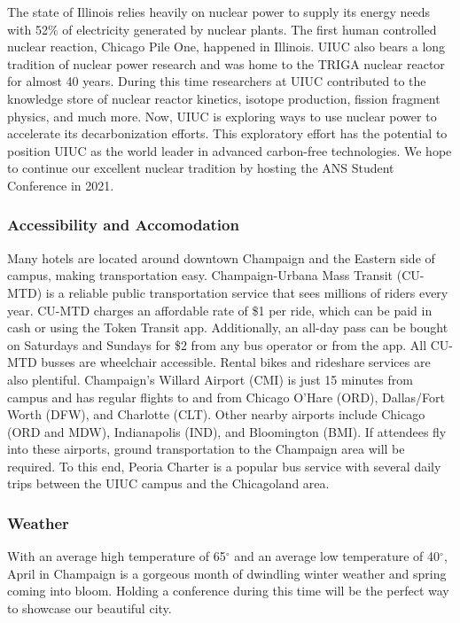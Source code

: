 The state of Illinois relies heavily on nuclear power to supply its energy needs with 52$\%$ of electricity generated by nuclear plants. The first human controlled nuclear reaction, Chicago Pile One, happened in Illinois. UIUC also bears a long tradition of nuclear power research and was home to the TRIGA nuclear reactor for almost 40 years. During this time researchers at UIUC contributed to the knowledge store of nuclear reactor kinetics, isotope production, fission fragment physics, and much more. Now, UIUC is exploring ways to use nuclear power to accelerate its decarbonization efforts. This exploratory effort has the potential to position UIUC as the world leader in advanced carbon-free technologies. We hope to continue our excellent nuclear tradition by hosting the ANS Student Conference in 2021. 
\clearpage

\subsubsection{Accessibility and Accomodation}
 Many hotels are located around downtown Champaign and the Eastern 
 side of campus, making transportation easy. Champaign-Urbana Mass Transit 
 (CU-MTD) is a reliable public transportation service that sees millions of 
 riders every year. CU-MTD charges an affordable rate of \$1 per ride, which 
 can be paid in cash or using the Token Transit app. Additionally, an all-day 
 pass can be bought on Saturdays and Sundays for \$2 from any bus operator or 
 from the app. All CU-MTD busses are wheelchair accessible. Rental bikes and 
 rideshare services are also plentiful.
 Champaign's Willard Airport (CMI) is just 15 minutes from campus and has 
regular flights to and from Chicago O’Hare (ORD), Dallas/Fort Worth (DFW), and 
Charlotte (CLT).  Other nearby airports include Chicago (ORD and MDW),
Indianapolis (IND), and Bloomington (BMI). If attendees fly into these
airports, ground transportation to the Champaign area will be required. To this
end, Peoria Charter is a popular bus service with several 
daily trips between the UIUC campus and the Chicagoland area.

\subsubsection{Weather}
With an average high temperature of 65$^{\circ}$ and an average low temperature 
of 40$^{\circ}$, April in Champaign is a gorgeous month of dwindling winter 
weather and spring coming into bloom. Holding a conference during this time 
will be the perfect way to showcase our beautiful city.


